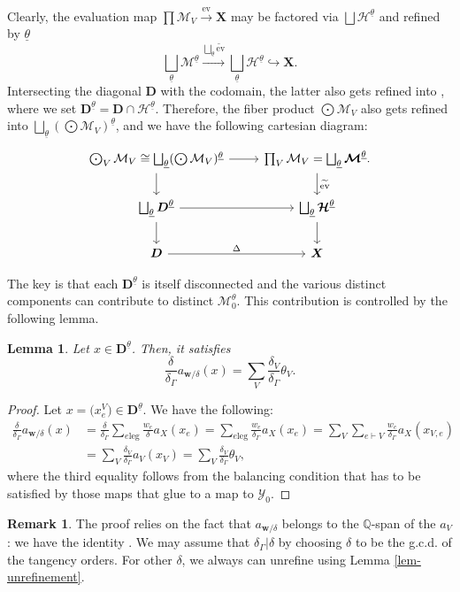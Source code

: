 \documentclass[pdftex]{sigma}
\newcommand{\ev}{\mathrm{ev}}
\newcommand{\QQ}{\mathbb{Q}}
\newcommand{\btheta}{ {\underline{\theta}} }
\newcommand{\bfX}{ {\boldsymbol X} }
\newcommand{\bfD}{ {\boldsymbol D} }
\newcommand{\bfw}{ {\boldsymbol w} }
\newcommand{\M}{\mathcal{M}}
\renewcommand{\H}{\mathcal{H}}
\newcommand{\Y}{\mathcal{Y}}
\numberwithin{equation}{section}
\newtheorem{lem}[theo]{Lemma}
\theoremstyle{definition}
\newtheorem{remarkk}[theo]{Remark}
\begin{document}
Clearly, the evaluation map $\prod\M_V\xrightarrow{\ev}\bfX$ may be factored via $\bigsqcup \boldsymbol{\H}^\btheta$ and refined by $\btheta$
\[ \bigsqcup_\btheta \boldsymbol{\M}^\btheta \xrightarrow{\bigsqcup_\btheta\widetilde{\ev}}\bigsqcup_\btheta \boldsymbol{\H}^\btheta \hookrightarrow\bfX .\]
Intersecting the diagonal $\bfD$ with the codomain, the latter also gets refined into \smash{$\bigsqcup_\btheta\bfD^\btheta$}, where we set $\bfD^\btheta=\bfD\cap\boldsymbol{\H}^\btheta$. Therefore, the fiber product $\bigodot\M_V$ also gets refined into $\bigsqcup_\btheta (\bigodot\M_V)^{\btheta}$, and we have the following cartesian diagram:
\[
\begin{tikzcd}
\bigodot_V \M_V\cong \bigsqcup_{\btheta} (\bigodot\M_V)^{\btheta}\ar[r]\ar[d] &\prod_V \M_V=\bigsqcup_{\btheta} \boldsymbol{\M}^\btheta . \ar[d,"\widetilde{\ev}"]\\
\bigsqcup_{\btheta}\bfD^\btheta\ar[r]\ar[d] & \bigsqcup_{\btheta} \boldsymbol{\H}^\btheta\ar[d]\\
\bfD\ar[r,"\Delta"] & \boldsymbol{X}
\end{tikzcd}
\]

The key is that each $\bfD^\btheta$ is itself disconnected and the various distinct components can contribute to distinct $\M_0^\theta$. This contribution is controlled by the following lemma.

\begin{lem}\label{lem-values-varphi-Q-span}
 Let $x\in\bfD^\btheta$. Then, it satisfies
 \[ \frac{\delta}{\delta_\Gamma}a_{\bfw/\delta}(x) = \sum_V\frac{\delta_V}{\delta_\Gamma}\theta_V. \]
\end{lem}

\begin{proof}
Let $x=\bigl(x_e^V\bigr)\in \bfD^\btheta$. We have the following:
\begin{align*}
\frac{\delta}{\delta_\Gamma}a_{\bfw/\delta}(x)&=\frac{\delta}{\delta_\Gamma}\sum_{e \text{leg}} \frac{w_e}{\delta}a_X(x_e)=\sum_{e \text{leg}} \frac{w_e}{\delta_\Gamma}a_X(x_e) = \sum_V \sum_{e\vdash V}\frac{w_e}{\delta_\Gamma}a_X(x_{V,e}) \\
&= \sum_V \frac{\delta_V}{\delta_\Gamma} a_V(x_V)
= \sum_V \frac{\delta_V}{\delta_\Gamma}\theta_V,
\end{align*}
where the third equality follows from the balancing condition that has to be satisfied by those maps that glue to a map to $\Y_0$.
\end{proof}

\begin{remarkk}
 The proof relies on the fact that $a_{\bfw/\delta}$ belongs to the $\QQ$-span of the $a_V$: we have the identity \smash{$\frac{\delta}{\delta_\Gamma}a_{\bfw/\delta}=\sum\frac{\delta_V}{\delta_\Gamma}a_V$}. We may assume that $\delta_\Gamma|\delta$ by choosing $\delta$ to be the g.c.d. of the tangency orders. For other $\delta$, we always can unrefine using Lemma \ref{lem-unrefinement}.
\end{remarkk}
\end{document}
